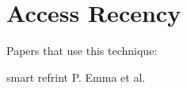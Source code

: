 \section{Access Recency}
\label{sec:acc}

Papers that use this technique:

smart
refrint
P. Emma et al.
